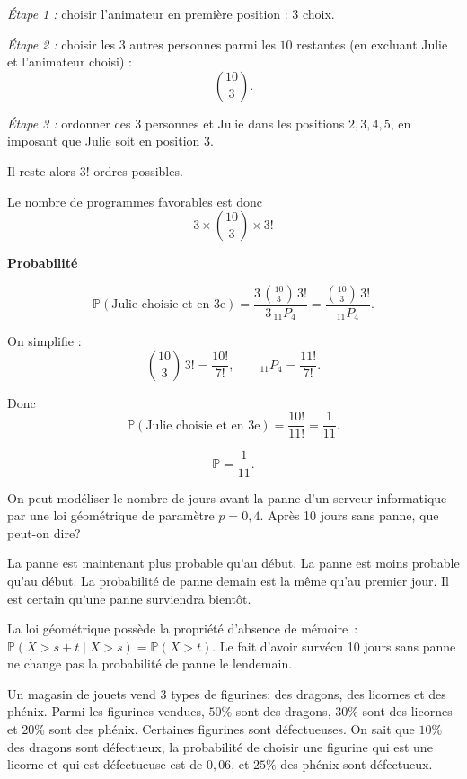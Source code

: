\begin{questions}
\begin{solution}
\emph{Étape 1 :} choisir l’animateur en première position : \(3\) choix.

\emph{Étape 2 :} choisir les \(3\) autres personnes parmi les \(10\) restantes (en excluant Julie et l’animateur choisi) :
\[
\binom{10}{3}.
\]

\emph{Étape 3 :} ordonner ces \(3\) personnes et Julie dans les positions
\(2,3,4,5\), en imposant que Julie soit en position \(3\).

Il reste alors \(3!\) ordres possibles.

Le nombre de programmes favorables est donc
\[
3\times \binom{10}{3}\times 3!
\]

\medskip
\textbf{Probabilité}

\[
\mathbb{P}(\text{Julie choisie et en 3e})
=
\frac{3\,\binom{10}{3}\,3!}{3\,{}_{11}P_{4}}
=
\frac{\binom{10}{3}\,3!}{{}_{11}P_{4}}.
\]

On simplifie :
\[
\binom{10}{3}\,3!
=
\frac{10!}{7!},
\qquad
{}_{11}P_{4}=\frac{11!}{7!}.
\]

Donc
\[
\mathbb{P}(\text{Julie choisie et en 3e})
=
\frac{10!}{11!}
=
\frac{1}{11}.
\]

\[
\boxed{\mathbb{P}=\frac{1}{11}.}
\]
\end{solution}

\vspace{12.5cm}

\question[2]

On peut modéliser le nombre de jours avant la panne d'un serveur informatique par une loi géométrique de paramètre $p=0{,}4$. Après 10 jours sans panne, que peut-on dire?

\begin{checkboxes}
\choice La panne est maintenant plus probable qu'au début.
\choice La panne est moins probable qu'au début.
\correctchoice La probabilité de panne demain est la même qu'au premier jour.
\choice Il est certain qu'une panne surviendra bientôt.
\end{checkboxes}
\begin{solution}
La loi géométrique possède la propriété d'absence de mémoire~: $\mathbb{P}(X > s+t \mid X > s) = \mathbb{P}(X > t)$. Le fait d'avoir survécu 10 jours sans panne ne change pas la probabilité de panne le lendemain.
\end{solution}


\pageblanche
\question[]

Un magasin de jouets vend 3 types de figurines: des dragons, des licornes et des phénix. Parmi les figurines vendues, $50\%$ sont des dragons, $30\%$ sont des licornes et $20\%$ sont des phénix. Certaines figurines sont défectueuses. On sait que $10\%$ des dragons sont défectueux, la probabilité de choisir une figurine qui est une licorne et qui est défectueuse est de $0{,}06$, et $25\%$ des phénix sont défectueux.


\end{questions}
